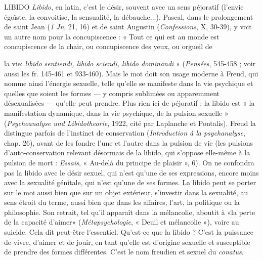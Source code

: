 {LIBIDO  {\it Libido}, en latin, c’est le désir, souvent avec un sens péjoratif (l'envie
égoïste, la convoitise, la sensualité, la débauche...). Pascal, dans le
prolongement de saint Jean ({\it 1 Jn}, 21, 16) et de saint Augustin ({\it Confessions}, X,
30-39), y voit un autre nom pour la concupiscence : « Tout ce qui est au
monde est concupiscence de la chair, ou concupiscence des yeux, ou orgueil de

la vie: {\it libido sentiendi, libido sciendi, libido dominandi} » ({\it Pensées}, 545-458 ;
voir aussi les fr. 145-461 et 933-460). Mais le mot doit son usage moderne à
Freud, qui nomme ainsi l'énergie sexuelle, telle qu’elle se manifeste dans la vie
psychique et quelles que soient les formes — y compris sublimées ou apparemment
désexualisées — qu’elle peut prendre. Plus rien ici de péjoratif : la libido
est « la manifestation dynamique, dans la vie psychique, de la pulsion sexuelle »
({\it Psychoanalyse und Libidotheorie}, 1922, cité par Laplanche et Pontalis). Freud la
distingue parfois de l'instinct de conservation ({\it Introduction à la psychanalyse},
chap. 26), avant de les fondre l’une et l’autre dans la pulsion de vie (les pulsions
d’auto-conservation relevant désormais de la libido, qui s’oppose elle-même à
la pulsion de mort : {\it Essais}, « Au-delà du principe de plaisir », 6). On ne confondra
pas la libido avec le désir sexuel, qui n’est qu’une de ses expressions,
encore moins avec la sexualité génitale, qui n’est qu’une de ses formes. La
libido peut se porter sur le moi aussi bien que sur un objet extérieur, s'investir
dans la sexualité, au sens étroit du terme, aussi bien que dans les affaires, l’art,
la politique ou la philosophie. Son retrait, tel qu’il apparaît dans la mélancolie,
aboutit à «la perte de la capacité d’aimer» ({\it Métapsychologie}, « Deuil et
mélancolie »), voire au suicide. Cela dit peut-être l'essentiel. Qu'est-ce que la
libido ? C’est la puissance de vivre, d’aimer et de jouir, en tant qu’elle est d’origine
sexuelle et susceptible de prendre des formes différentes. C’est le nom
freudien et sexuel du {\it conatus}.

}
